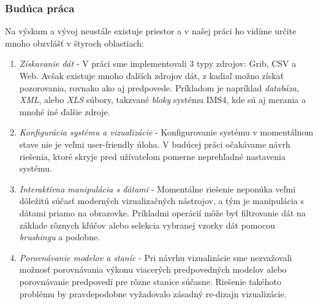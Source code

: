 \subsubsection{Budúca práca}

Na výskum a vývoj neustále existuje priestor a v našej práci ho vidíme určite mnoho obzvlášť v štyroch oblastiach:
\begin{enumerate}
	\item \textit{Získavanie dát} - V práci sme implementovali 3 typy zdrojov: Grib, CSV a Web. Avšak existuje mnoho ďalších zdrojov dát, z kadiaľ možno získať pozorovania, rovnako ako aj predpovede. Príkladom je napríklad \textit{databáza}, \textit{XML}, alebo \textit{XLS} súbory, takzvané \textit{bloky} systému IMS4, kde sú aj merania a mnohé iné ďalšie zdroje. 
	\item \textit{Konfigurácia systému a vizualizácie} - Konfigurovanie systému v momentálnom stave nie je veľmi user-friendly úloha. V budúcej práci očakávame návrh riešenia, ktoré skryje pred užívateľom pomerne neprehľadné nastavenia systému.
	\item \textit{Interaktívna manipulácia s dátami} - Momentálne riešenie neponúka veľmi dôležitú súčasť moderných vizualizačných nástrojov, a tým je manipulácia s dátami priamo na obrazovke. Príkladmi operácií môže byť filtrovanie dát na základe rôznych kľúčov alebo selekcia vybranej vzorky dát pomocou \textit{brushingu} a podobne.
	\item \textit{Porovnávanie modelov a staníc} - Pri návrhu vizualizácie sme nezvažovali možnosť porovnávania výkonu viacerých predpovedných modelov alebo porovnávanie predpovedí pre rôzne stanice súčasne. Riešenie takéhoto problému by pravdepodobne vyžadovalo zásadný re-dizajn vizualizácie.
	\end{enumerate} 	